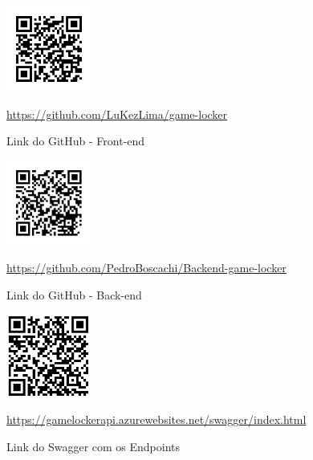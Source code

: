 \begin{figure}[H]
	\centering
	\includegraphics[width=0.25\textwidth]{imagens/links/githubFrontQRCode.png}
	\caption{Link do GitHub - Front-end}
    \url{https://github.com/LuKezLima/game-locker}
\end{figure}

\begin{figure}[H]
	\centering
	\includegraphics[width=0.25\textwidth]{imagens/links/githubBackQRCode.png}
	\caption{Link do GitHub - Back-end}
    \url{https://github.com/PedroBoscachi/Backend-game-locker}
\end{figure}

\begin{figure}[H]
	\centering
	\includegraphics[width=0.25\textwidth]{imagens/links/SwaggerQRCode.png}
	\caption{Link do Swagger com os Endpoints}
    \url{https://gamelockerapi.azurewebsites.net/swagger/index.html}
\end{figure}


\pagebreak